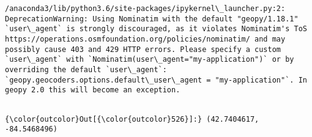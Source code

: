\documentclass[11pt]{article}
\begin{document}
    \begin{Verbatim}[commandchars=\\\{\}]
/anaconda3/lib/python3.6/site-packages/ipykernel\_launcher.py:2: DeprecationWarning: Using Nominatim with the default "geopy/1.18.1" `user\_agent` is strongly discouraged, as it violates Nominatim's ToS https://operations.osmfoundation.org/policies/nominatim/ and may possibly cause 403 and 429 HTTP errors. Please specify a custom `user\_agent` with `Nominatim(user\_agent="my-application")` or by overriding the default `user\_agent`: `geopy.geocoders.options.default\_user\_agent = "my-application"`. In geopy 2.0 this will become an exception.
  

    \end{Verbatim}

\begin{Verbatim}[commandchars=\\\{\}]
{\color{outcolor}Out[{\color{outcolor}526}]:} (42.7404617, -84.5468496)
\end{Verbatim}
            
\end{document}
